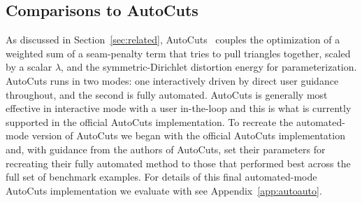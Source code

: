 \subsection{Comparisons to AutoCuts}
\label{sec:autocmpr}
As discussed in Section~\ref{sec:related}, AutoCuts~\cite{Poranne2017Autocuts} couples the optimization of a weighted sum of a seam-penalty term that tries to pull triangles together, scaled by a scalar $\lambda$, and the symmetric-Dirichlet distortion energy for parameterization. AutoCuts runs in two modes: one interactively driven by direct user guidance throughout, and the second is fully automated. AutoCuts is generally most effective in interactive mode with a user in-the-loop and this is what is currently supported in the official AutoCuts implementation. To recreate the automated-mode version of AutoCuts we began with the official AutoCuts implementation and, with guidance from the authors of AutoCuts, set their parameters for recreating their fully automated method to those that performed best across the full set of benchmark examples. For details of this final automated-mode AutoCuts implementation we evaluate with see Appendix\ \ref{app:autoauto}.


